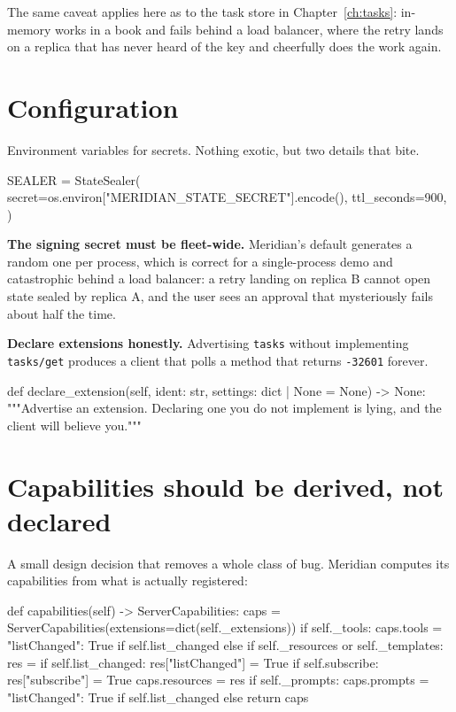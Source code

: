 The same caveat applies here as to the task store in Chapter~\ref{ch:tasks}:
in-memory works in a book and fails behind a load balancer, where the retry
lands on a replica that has never heard of the key and cheerfully does the work
again.

\section{Configuration}

Environment variables for secrets. Nothing exotic, but two details that bite.

\begin{py}
SEALER = StateSealer(
    secret=os.environ["MERIDIAN_STATE_SECRET"].encode(),
    ttl_seconds=900,
)
\end{py}

\textbf{The signing secret must be fleet-wide.} Meridian's default generates a
random one per process, which is correct for a single-process demo and
catastrophic behind a load balancer: a retry landing on replica B cannot open
state sealed by replica A, and the user sees an approval that mysteriously fails
about half the time.

\textbf{Declare extensions honestly.} Advertising \texttt{tasks} without
implementing \texttt{tasks/get} produces a client that polls a method that
returns \texttt{-32601} forever.

\begin{py}
def declare_extension(self, ident: str, settings: dict | None = None) -> None:
    """Advertise an extension. Declaring one you do not implement is lying,
    and the client will believe you."""
\end{py}

\section{Capabilities should be derived, not declared}

A small design decision that removes a whole class of bug. Meridian computes its
capabilities from what is actually registered:

\begin{py}
def capabilities(self) -> ServerCapabilities:
    caps = ServerCapabilities(extensions=dict(self._extensions))
    if self._tools:
        caps.tools = {"listChanged": True} if self.list_changed else {}
    if self._resources or self._templates:
        res = {}
        if self.list_changed:
            res["listChanged"] = True
        if self.subscribe:
            res["subscribe"] = True
        caps.resources = res
    if self._prompts:
        caps.prompts = {"listChanged": True} if self.list_changed else {}
    return caps
\end{py}

